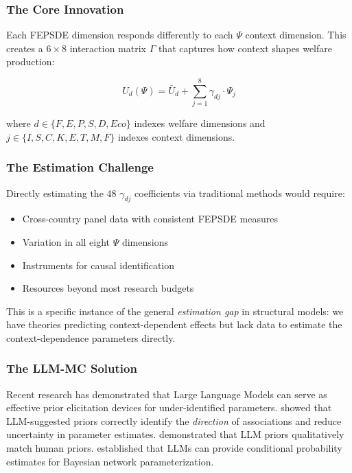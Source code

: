 \subsubsection{The Core Innovation}

Each FEPSDE dimension responds differently to each $\Psi$ context dimension.
This creates a $6 \times 8$ interaction matrix $\Gamma$ that captures how context
shapes welfare production:

\begin{equation}
  U_d(\Psi) = \bar{U}_d + \sum_{j=1}^{8} \gamma_{dj} \cdot \Psi_j
  \label{eq:U-Psi-interaction}
\end{equation}

where $d \in \{F, E, P, S, D, Eco\}$ indexes welfare dimensions
and $j \in \{I, S, C, K, E, T, M, F\}$ indexes context dimensions.

\subsubsection{The Estimation Challenge}

Directly estimating the 48 $\gamma_{dj}$ coefficients via traditional methods would require:
\begin{itemize}
  \item Cross-country panel data with consistent FEPSDE measures
  \item Variation in all eight $\Psi$ dimensions
  \item Instruments for causal identification
  \item Resources beyond most research budgets
\end{itemize}

This is a specific instance of the general \emph{estimation gap} in structural models:
we have theories predicting context-dependent effects but lack data to estimate
the context-dependence parameters directly.

\subsubsection{The LLM-MC Solution}

Recent research has demonstrated that Large Language Models can serve as effective
prior elicitation devices for under-identified parameters. \citet{llmpriors2025scientific}
showed that LLM-suggested priors correctly identify the \textit{direction} of associations
and reduce uncertainty in parameter estimates. \citet{zhu2024eliciting} demonstrated
that LLM priors qualitatively match human priors. \citet{nafar2025extracting} established
that LLMs can provide conditional probability estimates for Bayesian network parameterization.


